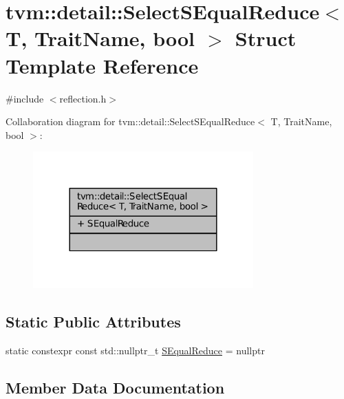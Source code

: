\hypertarget{structtvm_1_1detail_1_1SelectSEqualReduce}{}\section{tvm\+:\+:detail\+:\+:Select\+S\+Equal\+Reduce$<$ T, Trait\+Name, bool $>$ Struct Template Reference}
\label{structtvm_1_1detail_1_1SelectSEqualReduce}


{\ttfamily \#include $<$reflection.\+h$>$}



Collaboration diagram for tvm\+:\+:detail\+:\+:Select\+S\+Equal\+Reduce$<$ T, Trait\+Name, bool $>$\+:
\nopagebreak
\begin{figure}[H]
\begin{center}
\leavevmode
\includegraphics[width=240pt]{structtvm_1_1detail_1_1SelectSEqualReduce__coll__graph}
\end{center}
\end{figure}
\subsection*{Static Public Attributes}
\begin{DoxyCompactItemize}
\item 
static constexpr const std\+::nullptr\+\_\+t \hyperlink{structtvm_1_1detail_1_1SelectSEqualReduce_a6de180df5c5b0cec0e62f75e576259cb}{S\+Equal\+Reduce} = nullptr
\end{DoxyCompactItemize}


\subsection{Member Data Documentation}
